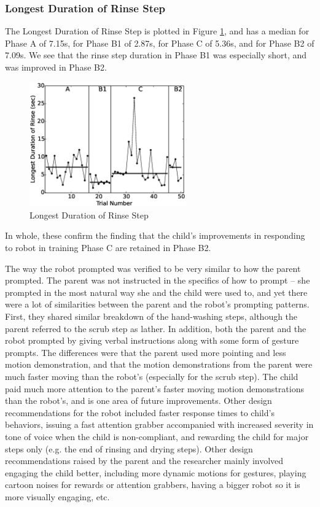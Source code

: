 \subsubsection{Longest Duration of Rinse Step}
The Longest Duration of Rinse Step is plotted in Figure \ref{fig:8LongestDurationofRinsesec}, and has a median for Phase A of 7.15s, for Phase B1 of 2.87s, for Phase C of 5.36s, and for Phase B2 of 7.09s.  We see that the rinse step duration in Phase B1 was especially short, and was improved in Phase B2.
\begin{figure} [H]
	\centering
	\includegraphics[width=0.6\textwidth]{./img/data_analysis/8LongestDurationofRinsesec.eps}
	\caption{Longest Duration of Rinse Step}
	\label{fig:8LongestDurationofRinsesec}
\end{figure}
In whole, these confirm the finding that the child's improvements in responding to robot in training Phase C are retained in Phase B2.

The way the robot prompted was verified to be very similar to how the parent prompted.  The parent was not instructed in the specifics of how to prompt -- she prompted in the most natural way she and the child were used to, and yet there were a lot of similarities between the parent and the robot's prompting patterns.  First, they shared similar breakdown of the hand-washing steps, although the parent referred to the scrub step as lather.  In addition, both the parent and the robot prompted by giving verbal instructions along with some form of gesture prompts.  The differences were that the parent used more pointing and less motion demonstration, and that the motion demonstrations from the parent were much faster moving than the robot's (especially for the scrub step).  The child paid much more attention to the parent's faster moving motion demonstrations than the robot's, and is one area of future improvements.  Other design recommendations for the robot included faster response times to child's behaviors, issuing a fast attention grabber accompanied with increased severity in tone of voice when the child is non-compliant, and rewarding the child for major steps only (e.g. the end of rinsing and drying steps).  Other design recommendations raised by the parent and the researcher mainly involved engaging the child better, including more dynamic motions for gestures, playing cartoon noises for rewards or attention grabbers, having a bigger robot so it is more visually engaging, etc.

